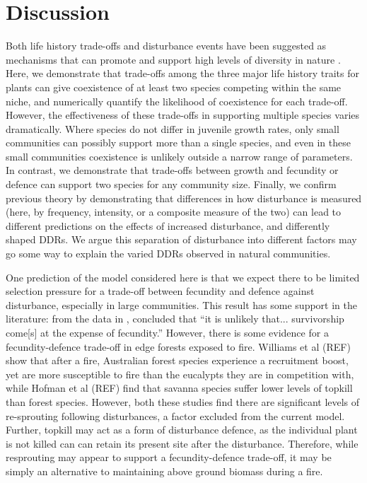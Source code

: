 \documentclass[a4paper]{article}
\begin{document}
\section{Discussion}
Both life history trade-offs and disturbance events have been suggested as mechanisms that can promote and support high levels of diversity in nature \citep[e.g.][]{adler2000space,denslow1987tropical,sousa1984role,turnbull1999seed}. Here, we demonstrate that trade-offs among the three major life history traits for plants can give coexistence of at least two species competing within the same niche, and numerically quantify the likelihood of coexistence for each trade-off. However, the effectiveness of these trade-offs in supporting multiple species varies dramatically. Where species do not differ in juvenile growth rates, only small communities can possibly support more than a single species, and even in these small communities coexistence is unlikely outside a narrow range of parameters. In contrast, we demonstrate that trade-offs between growth and fecundity or defence can support two species for any community size. Finally, we confirm previous theory \citep{miller2011frequency} by demonstrating that differences in how disturbance is measured (here, by frequency, intensity, or a composite measure of the two) can lead to different predictions on the effects of increased disturbance, and differently shaped DDRs. We argue this separation of disturbance into different factors may go some way to explain the varied DDRs observed in natural communities.

One prediction of the model considered here is that we expect there to be limited selection pressure for a trade-off between fecundity and defence against disturbance, especially in large communities. This result has some support in the literature: from the data in \cite{martin2010dispersal}, \cite{martin2010divergence} concluded that ``it is unlikely that... survivorship come[s] at the expense of fecundity.'' However, there is some evidence for a fecundity-defence trade-off in edge forests exposed to fire. Williams et al (REF) show that after a fire, Australian forest species experience a recruitment boost, yet are more susceptible to fire than the eucalypts they are in competition with, while Hofman et al (REF) find that savanna species suffer lower levels of topkill than forest species. However, both these studies find there are significant levels of re-sprouting following disturbances, a factor excluded from the current model. Further, topkill may act as a form of disturbance defence, as the individual plant is not killed can can retain its present site after the disturbance. Therefore, while resprouting may appear to support a fecundity-defence trade-off, it may be simply an alternative to maintaining above ground biomass during a fire.
\end{document}

